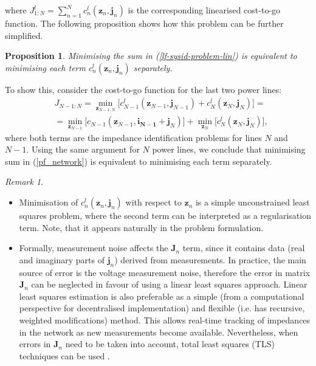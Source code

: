 \documentclass[journal,10pt,onecolumn,draftclsnofoot,]{IEEEtran}
\makeatletter
\theoremstyle{plain}
\newtheorem{proposition}{Proposition}
\theoremstyle{definition}
\theoremstyle{remark}
\newtheorem*{remark}{Remark}
\renewenvironment{proof}[1][\proofname]{\par
  \pushQED{\qed}%
  \normalfont \topsep6\p@\@plus6\p@\relax
  \list{}{%
    \settowidth{\leftmargin}{\itshape\proofname:\hskip\labelsep}%
    \setlength{\labelwidth}{0pt}%
    \setlength{\itemindent}{-\leftmargin}%
  }%
  \item[\hskip\labelsep\itshape#1\@addpunct{:}]\ignorespaces
}{%
  \popQED\endlist\@endpefalse
}
\makeatother
\begin{document}
where $J^l_{1:N} = \sum_{n = 1}^{N} c^l_n(\bm{z}_{n}, \bm{j}_n)$ is the corresponding linearised cost-to-go function. The following proposition shows how this problem can be further simplified.
\begin{proposition}
Minimising the sum in (\ref{lf-sysid-problem-lin}) is equivalent to minimising each term $c^l_n(\bm{z}_{n}, \bm{j}_n)$ separately.
\end{proposition}
\begin{proof}
  To show this, consider the cost-to-go function for the last two power lines:
  \begin{equation*}
    \begin{split}
    &{}J_{N-1:N} = \min_{\bm{z}_{N-1:N}} \big[ c^l_{N-1}(\bm{z}_{N-1}, \bm{j}_{N-1}) + c^l_N(\bm{z}_{N}, \bm{j}_{N}) \big] = \\
    & = \min_{\bm{z}_{N-1}} \big[ c_{N-1}(\bm{z}_{N-1}, \bm{i_{N-1}} + \bm{j}_{N}) \big] + \min_{\bm{z}_{N}} \big[ c^l_N(\bm{z}_{N}, \bm{j}_{N}) \big],
    \end{split}
  \end{equation*}
  where both terms are the impedance identification problems for lines $N$ and $N-1$. Using the same argument for $N$ power lines, we conclude that minimising sum in (\ref{pf_network}) is equivalent to minimising each term separately.
\end{proof}
\begin{remark}
\hfill
\begin{itemize}
  \item Minimisation of $c^l_n(\bm{z}_n, \bm{j}_n)$ with respect to $\bm{z}_n$ is a simple unconstrained least squares problem, where the second term can be interpreted as a regularisation term. Note, that it appears naturally in the problem formulation.
  \item Formally, measurement noise affects the $\bm{J}_n$ term, since it contains data (real and imaginary parts of $\bm{j}_n$) derived from measurements. In practice, the main source of error is the voltage measurement noise, therefore the error in matrix $\bm{J}_n$ can be neglected in favour of using a linear least squares approach. Linear least squares estimation is also preferable as a simple (from a computational perspective for decentralised implementation) and flexible (i.e. has recursive, weighted modifications) method. This allows real-time tracking of impedances in the network as new measurements become available. Nevertheless, when errors in $\bm{J}_n$ need to be taken into account, total least squares (TLS) techniques can be used \cite{golub1999tikhonov}.
\end{itemize}
\end{remark}
\end{document}
